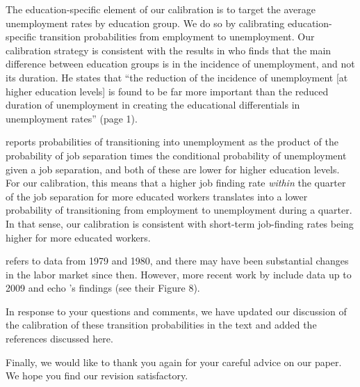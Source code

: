 \documentclass[12pt,letterpaper,english]{article}
\begin{document}
\begin{enumerate}
\begin{enumerate}
		The education-specific element of our calibration is to target the average unemployment rates by education group. We do so by calibrating education-specific transition probabilities from employment to unemployment. Our calibration strategy is consistent with the results in \citet{mincer1991education} who finds that the main difference between education groups is in the incidence of unemployment, and not its duration. He states that ``the reduction of the incidence of unemployment [at higher education levels] is found to be far more important than the reduced duration of unemployment in creating the educational differentials in unemployment rates'' (page 1). 
		
		\citeauthor{mincer1991education} reports probabilities of transitioning into unemployment as the product of the probability of job separation times the conditional probability of unemployment given a job separation, and both of these are lower for higher education levels. For our calibration, this means that a higher job finding rate \textit{within} the quarter of the job separation for more educated workers translates into a lower probability of transitioning from employment to unemployment during a quarter. In that sense, our calibration is consistent with short-term job-finding rates being higher for more educated workers. 
		
		\citet{mincer1991education} refers to data from 1979 and 1980, and there may have been substantial changes in the labor market since then. However, more recent work by \citet{elsby2010labor} include data up to 2009 and echo \citeauthor{mincer1991education}'s findings (see their Figure 8). 
		
		In response to your questions and comments, we have updated our discussion of the calibration of these transition probabilities in the text and added the references discussed here. 
		
	\end{enumerate}
\end{enumerate}

\bigskip

\noindent Finally, we would like to thank you again for your careful advice on our paper. We hope you find our revision satisfactory.



\end{document}

